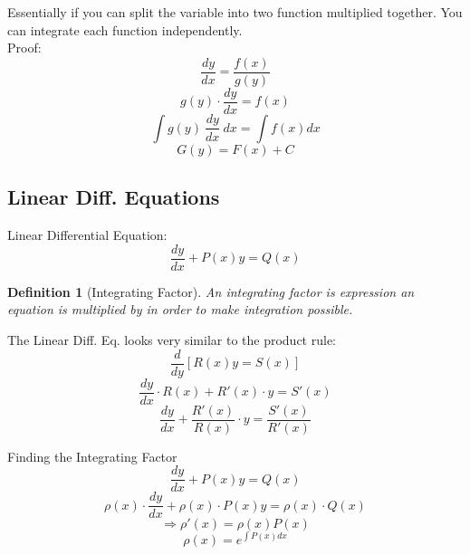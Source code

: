 \documentclass[12pt]{article}
\newtheorem{definition}{Definition}[section]
\numberwithin{equation}{subsection}
\newcommand{\derx}[1]{\frac{d #1}{dx}}
\newcommand{\dery}[1]{\frac{d #1}{dy}}
\newcommand{\deryx}{\frac{dy}{dx}}
\begin{document}
Essentially if you can split the variable into two function multiplied together. You can integrate each function independently.\\

\noindent Proof:
\begin{equation}
\derx{y} = \frac{f(x)}{g(y)} \tag{1.3.1}
\end{equation}
\begin{equation}
g(y) \cdot \deryx = f(x)
\end{equation}
\begin{equation}
\int g(y) \  \deryx \ dx = \int f(x) dx
\end{equation}
\begin{equation}
G(y)= F(x) + C
\end{equation}

\subsection{Linear Diff. Equations}
Linear Differential Equation:
\begin{equation}
\deryx + P(x)y=Q(x) \label{2}
\end{equation}

\begin{definition}[Integrating Factor]
An integrating factor is expression an equation is multiplied by in order to make integration possible.
\end{definition}

The Linear Diff. Eq. looks very similar to the product rule:
\begin{equation}
\dery{} [R(x)y=S(x)]
\end{equation}
\begin{equation}
\deryx \cdot R(x) + R'(x) \cdot y = S'(x)
\end{equation}
\begin{equation}
\deryx + \frac{R'(x)}{R(x)}\cdot y = \frac{S'(x)}{R'(x)}
\end{equation}

Finding the Integrating Factor
\begin{equation}
\deryx + P(x)y=Q(x) \tag{1.4.1}
\end{equation}
\begin{equation}
\rho (x) \cdot \deryx + \rho (x) \cdot P(x)y= \rho (x) \cdot Q(x)
\end{equation}
\begin{equation}
\Rightarrow \rho '(x)= \rho (x)P(x)
\end{equation}
\begin{equation}
\rho (x)= e^{\int P(x)dx} \label{3}
\end{equation}
\end{document}
